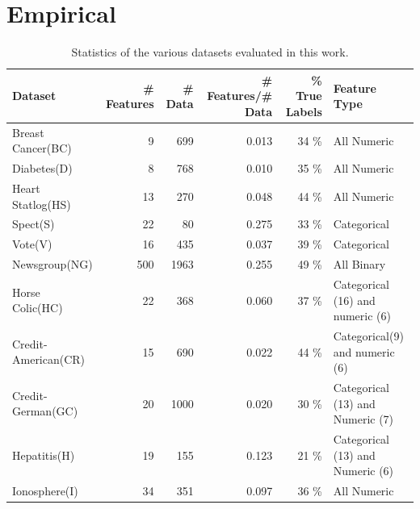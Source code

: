 \section{Empirical}

\begin{table}[tbp!]
\centering
\begin{tabular}{|l|r|r|r|r|l|} \hline
Dataset & \# Features & \# Data & \# Features/\# Data & \% True Labels & Feature Type\\ \hline \hline 
Breast Cancer(BC)	& 9	& 699	& 0.013	& 34 \%	& All Numeric\\ \hline
Diabetes(D)        & 8	& 768	& 0.010	& 35 \%	& All Numeric\\ \hline
Heart Statlog(HS)	& 13	& 270	& 0.048	& 44 \%	& All Numeric\\ \hline
Spect(S)	        & 22	& 80	& 0.275 & 33 \%	& Categorical\\ \hline
Vote(V)	        & 16	& 435	& 0.037	& 39 \%	& Categorical\\ \hline
Newsgroup(NG)	& 500	& 1963	& 0.255	& 49 \%	& All Binary\\ \hline
Horse Colic(HC)	& 22	& 368	& 0.060	& 37 \%	& Categorical (16) and numeric (6)\\ \hline
Credit-American(CR)	& 15	& 690	& 0.022	& 44 \%	& Categorical(9) and numeric (6)\\ \hline
Credit-German(GC)	& 20	& 1000	& 0.020 & 30 \%	& Categorical (13) and Numeric (7)\\ \hline
Hepatitis(H)	& 19	& 155	& 0.123	& 21 \%	& Categorical (13) and Numeric (6)\\ \hline
Ionosphere(I)	& 34	& 351	& 0.097	& 36 \%	& All Numeric\\ \hline
\end{tabular}
\caption{\footnotesize Statistics of the various datasets evaluated in this work.}
\label{table:stats}
\end{table}

